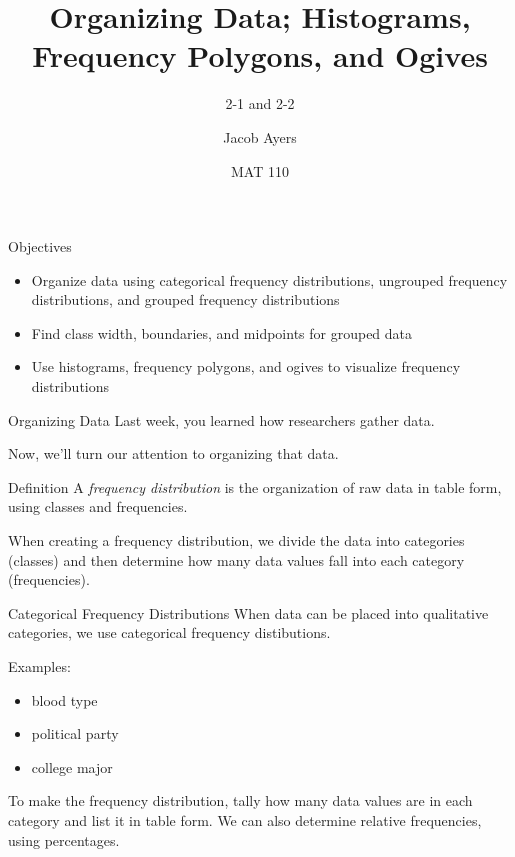 \documentclass[t, aspectratio=169]{beamer}
\title[VL3]{Organizing Data; Histograms, Frequency Polygons, and Ogives}
\subtitle{2-1 and 2-2}
\author{Jacob Ayers}
\institute{Lesson \#3}
\date{MAT 110}
\newcommand{\?}{\stackrel{?}{=}}
\begin{document}
	
	\begin{frame}
		\titlepage
	\end{frame}
	
	\begin{frame}{Objectives}
		\begin{itemize}
			\item Organize data using categorical frequency distributions, ungrouped frequency distributions, and grouped frequency distributions
			\item Find class width, boundaries, and midpoints for grouped data
			\item Use histograms, frequency polygons, and ogives to visualize frequency distributions
		\end{itemize}
	\end{frame}

	\begin{frame}{Organizing Data}
		Last week, you learned how researchers gather data. \pause
		
		Now, we'll turn our attention to organizing that data. \pause
		
		\begin{block}{Definition}
			A \textit{frequency distribution} is the organization of raw data in table form, using classes and frequencies.
		\end{block} \pause
	
		When creating a frequency distribution, we divide the data into categories (classes) and then determine how many data values fall into each category (frequencies).
	\end{frame}

	\begin{frame}{Categorical Frequency Distributions}
		When data can be placed into qualitative categories, we use categorical frequency distibutions. \pause
		
		Examples: \begin{itemize}
			\item blood type
			\item political party
			\item college major
		\end{itemize} \pause
	
		To make the frequency distribution, tally how many data values are in each category and list it in table form. We can also determine relative frequencies, using percentages. 
	\end{frame}
\end{document}
